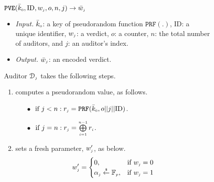  \vspace{-1.8mm}
\begin{figure}[!htbp]
\setlength{\fboxsep}{1pt}
\begin{center}
    \begin{tcolorbox}[enhanced,width=81mm, height=66.5mm, left=0mm,
    drop fuzzy shadow southwest,
    colframe=black,colback=white]
   { \small{
    \vspace{-2.1mm}
\underline{$\mathtt{PVE}(\bar{k}_{\scriptscriptstyle 0}, \text{ID},  w_{\scriptscriptstyle j}, o, n,  j)\rightarrow  \bar{  w}_{\scriptscriptstyle j}$}\\
%
    \vspace{-1mm}
\begin{itemize}[leftmargin=4.2mm]
\item \noindent\textit{Input.} $\bar{k}_{\scriptscriptstyle 0}$: a key of  pseudorandom function $\mathtt{PRF}(.)$, $\text{ID}$: a unique identifier, $ w_{\scriptscriptstyle j}$: a  verdict, $o$: a counter, $n$: the total number of  auditors,  and  $j$: an auditor's index.
%
\item \noindent\textit{Output.} $\bar{  w}_{\scriptscriptstyle j}$:  an  encoded verdict.  
%
\end{itemize}
Auditor $\mathcal{D}_{\scriptscriptstyle j}$ takes the following steps.
    \vspace{-1.2mm}
\begin{enumerate}[leftmargin=5.2mm]
%
\item\label{ZSPA:val-gen} computes a  pseudorandom  value,  as follows. 
%
\begin{itemize}
%
\item[$\bullet$]$ \text{ if } j< n: r_{\scriptscriptstyle j}=\mathtt{PRF}(\bar k_{\scriptscriptstyle 0}, o||j||\text{ID})$.\\
%
    \vspace{-1.6mm}
\item [$\bullet$] $ \text{ if } j=n: r_{\scriptscriptstyle j}= \bigoplus\limits^{\scriptscriptstyle n-1}_{\scriptscriptstyle i=1} r_{\scriptscriptstyle i}$.
%
\end{itemize}
%
\item  sets a fresh parameter, $w'_{\scriptscriptstyle j}$, as below. 
%
    \vspace{-1.5mm}
\begin{equation*}
   w'_{\scriptscriptstyle j}= 
\begin{cases}
   0,              & \text{if } w_{\scriptscriptstyle j}=0\\
   \alpha_{\scriptscriptstyle j}\stackrel{\scriptscriptstyle\$}\leftarrow \mathbb{F}_{\scriptscriptstyle p} ,& \text{if } w_{\scriptscriptstyle j}=1\\

\end{cases}
\end{equation*}
%


\end{enumerate}}}
\end{tcolorbox}
\end{center}
\end{figure}
